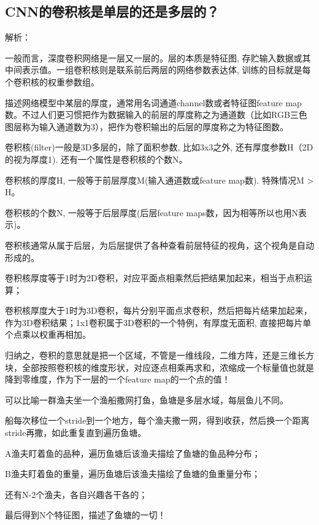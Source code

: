\documentclass[UTF8]{ctexbook}
\begin{document}
\subsection{CNN的卷积核是单层的还是多层的？}

解析：

一般而言，深度卷积网络是一层又一层的。层的本质是特征图, 存贮输入数据或其中间表示值。一组卷积核则是联系前后两层的网络参数表达体, 训练的目标就是每个卷积核的权重参数组。



描述网络模型中某层的厚度，通常用名词通道channel数或者特征图feature map数。不过人们更习惯把作为数据输入的前层的厚度称之为通道数（比如RGB三色图层称为输入通道数为3），把作为卷积输出的后层的厚度称之为特征图数。



卷积核(filter)一般是3D多层的，除了面积参数, 比如3x3之外, 还有厚度参数H（2D的视为厚度1). 还有一个属性是卷积核的个数N。



卷积核的厚度H, 一般等于前层厚度M(输入通道数或feature map数). 特殊情况M > H。

卷积核的个数N, 一般等于后层厚度(后层feature maps数，因为相等所以也用N表示)。

卷积核通常从属于后层，为后层提供了各种查看前层特征的视角，这个视角是自动形成的。

卷积核厚度等于1时为2D卷积，对应平面点相乘然后把结果加起来，相当于点积运算；

卷积核厚度大于1时为3D卷积，每片分别平面点求卷积，然后把每片结果加起来，作为3D卷积结果；1x1卷积属于3D卷积的一个特例，有厚度无面积, 直接把每片单个点乘以权重再相加。



归纳之，卷积的意思就是把一个区域，不管是一维线段，二维方阵，还是三维长方块，全部按照卷积核的维度形状，对应逐点相乘再求和，浓缩成一个标量值也就是降到零维度，作为下一层的一个feature map的一个点的值！

可以比喻一群渔夫坐一个渔船撒网打鱼，鱼塘是多层水域，每层鱼儿不同。

船每次移位一个stride到一个地方，每个渔夫撒一网，得到收获，然后换一个距离stride再撒，如此重复直到遍历鱼塘。

A渔夫盯着鱼的品种，遍历鱼塘后该渔夫描绘了鱼塘的鱼品种分布；

B渔夫盯着鱼的重量，遍历鱼塘后该渔夫描绘了鱼塘的鱼重量分布；

还有N-2个渔夫，各自兴趣各干各的；

最后得到N个特征图，描述了鱼塘的一切！
\end{document}
